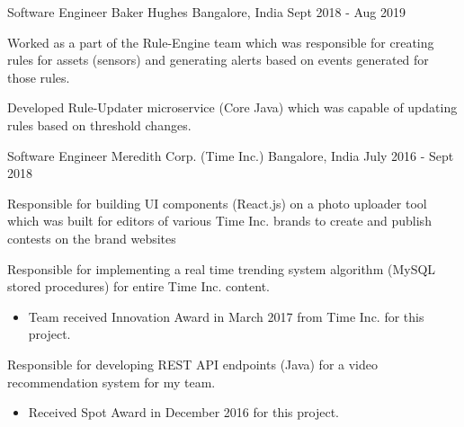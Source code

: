 \begin{cventries}
  \cventry
    {Software Engineer} %
    {Baker Hughes} %
    {Bangalore, India} %
    {Sept 2018 - Aug 2019} %
    {
      \begin{cvitems} %
        \item {Worked as a part of the Rule-Engine team which was responsible for creating rules for assets (sensors) and generating alerts based on events generated for those rules.}
        \item {Developed Rule-Updater microservice (Core Java) which was capable of updating rules based on threshold changes.}
      \end{cvitems}
    }

  \cventry
    {Software Engineer} %
    {Meredith Corp. (Time Inc.)} %
    {Bangalore, India} %
    {July 2016 - Sept 2018} %
    {
      \begin{cvitems} %
        \item {Responsible for building UI components (React.js) on a photo uploader tool which was built for editors of various Time Inc. brands to create and publish contests on the brand websites}
        \item {Responsible for implementing a real time trending system algorithm (MySQL stored procedures) for entire Time Inc. content.}
        \begin{itemize}
          \item{Team received Innovation Award in March 2017 from Time Inc. for this project.}
        \end{itemize}
        \item {Responsible for developing REST API endpoints (Java) for a video recommendation system for my team.}
        \begin{itemize}
          \item{Received Spot Award in December 2016 for this project.}
        \end{itemize}
      \end{cvitems}
    }

\end{cventries}
